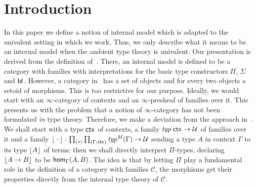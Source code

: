 \section{Introduction}
In this paper we define a notion of internal model which is adapted to
the univalent setting in which we work. Thus, we only describe what it means
to be an internal model when the ambient type theory is univalent. Our
presentation is derived from the definition of~\cite{Dybjer1996}. There,
an internal model is defined to be a category with families with interpretations
for the basic type constructors $\Pi$, $\Sigma$ and $\idtypevar{}$. However,
a category in~\cite{Dybjer1996} has a set of objects and for every two objects
a setoid of morphisms. This is too restrictive for our purpose. Ideally, we
would start with an $\infty$-category of contexts and an $\infty$-presheaf
of families over it. This presents us with the problem that a notion of
$\infty$-category has not been formulated \emph{in} type theory. Therefore,
we make a deviation from the approach in~\cite{Dybjer1996}. We shall
start with a type $\tfctx$ of contexts, a family $\mftypfunc:\tfctx\to\type$
of families over it and a family $\terms{\blank}:\prd*{\Gamma:\tfctx}\mftyp{\mfM}{\Gamma}
\to\type$ sending a type $A$ in context $\Gamma$ to its type $\terms{A}$ of
terms; then we shall directly interpret $\Pi$-types, declaring
$\terms{A\to B}$ to be $\ctxhom[\Gamma]{A}{B}$. The idea is that by letting
$\Pi$ play a fundamental role in the definition of a category with families
$\mathcal{C}$,
the morphisms get their properties directly from the internal type theory
of $\mathcal{C}$.

\begin{comment}
We briefly list the data of which an internal model of type theory consits. We
consider internal models in the style of~\cite{Dybjer1996}. Thus we will
describe a model $\mfM$ as a category with families. However, since our setting is
univalent type theory we will deviate from~\cite{Dybjer1996} in the following
respects: first of all, we make use of typical ambiguity and hence omit
reference to a thing called \emph{sort}. 

We organize the definition of an internal model $\mfM$ as follows: in
\autoref{internal-model-contexts} we describe the category of contexts itself;
in \autoref{internal-model-families} we describe the families over a given context
and the related operations; in \autoref{internal-model-constructors} we
describe the basic constructors in the internal model.
\end{comment}

